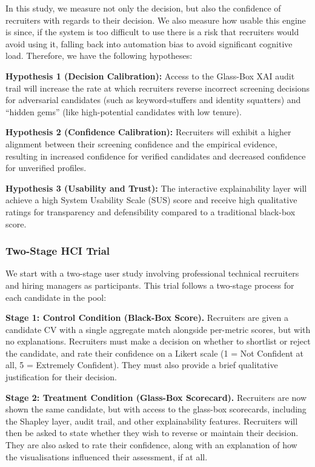 In this study, we measure not only the decision, but also the confidence of recruiters with regards to their decision.
We also measure how usable this engine is since, if the system is too difficult to use there is a risk that recruiters would 
avoid using it, falling back into automation bias to avoid significant cognitive load. Therefore, we have the following hypotheses:

\textbf{Hypothesis 1 (Decision Calibration):} Access to the Glass-Box XAI audit trail will increase the rate at which recruiters reverse incorrect screening decisions for adversarial candidates (such as keyword-stuffers and identity squatters) and ``hidden gems'' (like high-potential candidates with low tenure).

\textbf{Hypothesis 2 (Confidence Calibration):} Recruiters will exhibit a higher alignment between their screening confidence and the empirical evidence, resulting in increased confidence for verified candidates and decreased confidence for unverified profiles.

\textbf{Hypothesis 3 (Usability and Trust):} The interactive explainability layer will achieve a high System Usability Scale (SUS) score and receive high qualitative ratings for transparency and defensibility compared to a traditional black-box score.

\subsubsection{Two-Stage HCI Trial}
We start with a two-stage user study involving professional technical recruiters and hiring managers as participants.
This trial follows a two-stage process for each candidate in the pool:

\textbf{Stage 1: Control Condition (Black-Box Score).} Recruiters are given a candidate CV with a single aggregate match alongside per-metric scores, but with no explanations.
Recruiters must make a decision on whether to shortlist or reject the candidate, and rate their confidence on a Likert scale
(1 = Not Confident at all, 5 = Extremely Confident). They must also provide a brief qualitative justification for their decision.

\textbf{Stage 2: Treatment Condition (Glass-Box Scorecard).} Recruiters are now shown the same candidate, but with access to the glass-box scorecards, including the Shapley layer, audit trail,
and other explainability features. Recruiters will then be asked to state whether they wish to reverse or maintain their decision.
They are also asked to rate their confidence, along with an explanation of how the visualisations influenced their assessment, if at all.

